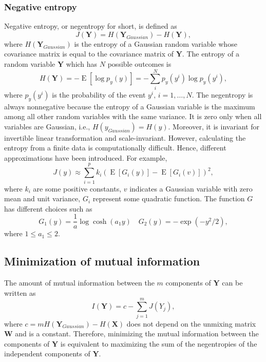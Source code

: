 \subsubsection{Negative entropy\label{Sec:DR:ICA:MnG:ne}}
Negative entropy, or negentropy for short, is defined as
\begin{equation}
	J(\mathbf{Y})=H(\mathbf{Y}_{Gaussian})-H(\mathbf{Y}),
\end{equation}
where $H(\mathbf{Y}_{Gaussian})$ is the entropy of a Gaussian random variable whose covariance matrix is equal to the covariance matrix of $\mathbf{Y}$. The entropy of a random variable $\mathbf{Y}$ which has $N$ possible outcomes is
\begin{equation}
	H(\mathbf{Y})=-\operatorname{E}\left[\log{p_y(y)}\right]=-\sum_i^N p_y(y^i)\log{p_y(y^i)},
\end{equation}
where $p_y(y^i)$ is the probability of the event $y^i,\, i=1,\dots, N$. The negentropy is always nonnegative because the entropy of a Gaussian variable is the maximum among all other random variables with the same variance. It is zero only when all variables are Gaussian, i.e., $H(y_{Gaussian})=H(y)$. Moreover, it is invariant for invertible linear transformation and scale-invariant. However, calculating the entropy from a finite data is computationally difficult. Hence, different approximations have been introduced. For example,
\begin{equation}
	J(y)\approx \sum_{i=1}^p k_i\left({\operatorname{E}}\left[G_i(y)\right]-{\operatorname{E}}\left[G_i(v)\right]\right)^2,
\end{equation} 
where $k_i$ are some positive constants, $v$ indicates a Gaussian variable with zero mean and unit variance, $G_i$ represent some quadratic function. The function $G$ has different choices such as
\begin{equation}
	G_1(y)=\frac{1}{a}\log\cosh (a_1y) \quad G_2(y)=-\exp(-y^2/2),
\end{equation}
where $1\leq a_1 \leq 2$.

\subsection{Minimization of mutual information\label{Sec:DR:ICA:MMI}}
The amount of mutual information between the $m$ components of $\mathbf{Y}$ can be written as
\begin{equation}
	I(\mathbf{Y})=c-\sum_{j=1}^m J(Y_j),
\end{equation}
where $c=mH(\mathbf{Y}_{Gaussian})-H(\mathbf{X})$ does not depend on the unmixing matrix $\mathbf{W}$ and is a constant. Therefore, minimizing the mutual information between the components of $\mathbf{Y}$ is equivalent to maximizing the sum of the negentropies of the independent components of $\mathbf{Y}$.

